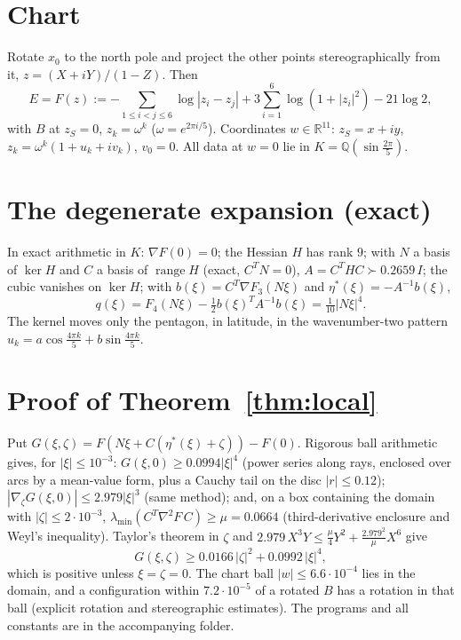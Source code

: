 \documentclass[11pt]{amsart}
\theoremstyle{remark}
\begin{document}
\section{Chart}
Rotate $x_0$ to the north pole and project the other points stereographically from it,
$z=(X+iY)/(1-Z)$. Then
\[
E=F(z):=-\sum_{1\le i<j\le 6}\log|z_i-z_j|+3\sum_{i=1}^6\log(1+|z_i|^2)-21\log 2,
\]
with $B$ at $z_S=0$, $z_k=\omega^k$ ($\omega=e^{2\pi i/5}$). Coordinates $w\in\mathbb R^{11}$:
$z_S=x+iy$, $z_k=\omega^k(1+u_k+iv_k)$, $v_0=0$. All data at $w=0$ lie in $K=\mathbb Q(\sin\frac{2\pi}5)$.

\section{The degenerate expansion (exact)}
In exact arithmetic in $K$: $\nabla F(0)=0$; the Hessian $H$ has rank $9$; with $N$ a basis of $\ker H$
and $C$ a basis of $\operatorname{range}H$ (exact, $C^TN=0$), $A=C^THC\succ 0.2659\,I$; the cubic vanishes
on $\ker H$; with $b(\xi)=C^T\nabla F_3(N\xi)$ and $\eta^*(\xi)=-A^{-1}b(\xi)$,
\[
q(\xi)=F_4(N\xi)-\tfrac12 b(\xi)^TA^{-1}b(\xi)=\tfrac1{10}|N\xi|^4 .
\]
The kernel moves only the pentagon, in latitude, in the wavenumber-two pattern
$u_k=a\cos\frac{4\pi k}5+b\sin\frac{4\pi k}5$.

\section{Proof of Theorem~\ref{thm:local}}
Put $G(\xi,\zeta)=F(N\xi+C(\eta^*(\xi)+\zeta))-F(0)$. Rigorous ball arithmetic gives, for
$|\xi|\le 10^{-3}$: $G(\xi,0)\ge 0.0994|\xi|^4$ (power series along rays, enclosed over arcs by a
mean-value form, plus a Cauchy tail on the disc $|r|\le 0.12$);
$|\nabla_\zeta G(\xi,0)|\le 2.979|\xi|^3$ (same method); and, on a box containing the domain with
$|\zeta|\le 2\cdot10^{-3}$, $\lambda_{\min}(C^T\nabla^2F\,C)\ge\mu=0.0664$ (third-derivative enclosure and
Weyl's inequality). Taylor's theorem in $\zeta$ and $2.979\,X^3Y\le\frac{\mu}{4}Y^2+\frac{2.979^2}{\mu}X^6$ give
\[
G(\xi,\zeta)\ge 0.0166\,|\zeta|^2+0.0992\,|\xi|^4 ,
\]
which is positive unless $\xi=\zeta=0$. The chart ball $|w|\le 6.6\cdot10^{-4}$ lies in the domain, and a
configuration within $7.2\cdot10^{-5}$ of a rotated $B$ has a rotation in that ball (explicit rotation and
stereographic estimates). The programs and all constants are in the accompanying folder.
\end{document}
